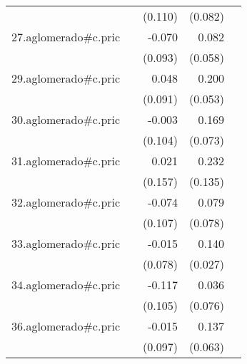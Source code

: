 {\begin{longtable}{l*{4}{D{.}{.}{-1}}}
            &                     &     (0.110)         &     (0.082)         &                     \\
\addlinespace
27.aglomerado#c.pric&                     &      -0.070         &       0.082         &                     \\
            &                     &     (0.093)         &     (0.058)         &                     \\
\addlinespace
29.aglomerado#c.pric&                     &       0.048         &       0.200\sym{***}&                     \\
            &                     &     (0.091)         &     (0.053)         &                     \\
\addlinespace
30.aglomerado#c.pric&                     &      -0.003         &       0.169\sym{*}  &                     \\
            &                     &     (0.104)         &     (0.073)         &                     \\
\addlinespace
31.aglomerado#c.pric&                     &       0.021         &       0.232         &                     \\
            &                     &     (0.157)         &     (0.135)         &                     \\
\addlinespace
32.aglomerado#c.pric&                     &      -0.074         &       0.079         &                     \\
            &                     &     (0.107)         &     (0.078)         &                     \\
\addlinespace
33.aglomerado#c.pric&                     &      -0.015         &       0.140\sym{***}&                     \\
            &                     &     (0.078)         &     (0.027)         &                     \\
\addlinespace
34.aglomerado#c.pric&                     &      -0.117         &       0.036         &                     \\
            &                     &     (0.105)         &     (0.076)         &                     \\
\addlinespace
36.aglomerado#c.pric&                     &      -0.015         &       0.137\sym{*}  &                     \\
            &                     &     (0.097)         &     (0.063)         &                     \\

\end{longtable}}
